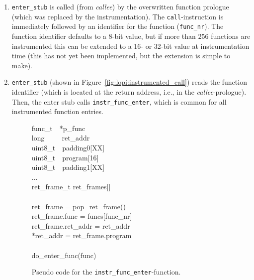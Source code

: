 \begin{enumerate}
\item \texttt{enter\_stub} is called (from \emph{callee}) by the overwritten
  function prologue (which was replaced by the instrumentation). The
  \texttt{call}-instruction is immediately followed by an identifier for the
  function (\texttt{func\_nr}). The function identifier defaults to a 8-bit
  value, but if more than 256 functions are instrumented this can be extended
  to a 16- or 32-bit value at instrumentation time (this has not yet been
  implemented, but the extension is simple to make).

\item \texttt{enter\_stub} (shown in Figure~\ref{fig:lopi:instrumented_call}) reads
  the function identifier (which is located at the return address, i.e., in the
  \emph{callee}-prologue). Then, the enter stub calls
  \texttt{instr\_func\_enter}, which is common for all instrumented function
  entries.

\begin{figure}[htb]
  \begin{center}
    \begin{pseudocode}
          func\_t~~*p\_func \\
          long~~~~~ret\_addr \\
          uint8\_t~~padding0[XX] \\
          uint8\_t~~program[16]\\
          uint8\_t~~padding1[XX] \\
          ...
        \ENDSTRUCT
        \\
        ret\_frame\_t ret\_frames[]
        \\
        \\
          ret\_frame = pop\_ret\_frame()\\
          ret\_frame.func = funcs[func\_nr]\\
          ret\_frame.ret\_addr = ret\_addr\\
          *ret\_addr = ret\_frame.program\\
          \\
          do\_enter\_func(func)
        \ENDFUNC
      \end{pseudocode}
    \end{center}
    \caption{Pseudo code for the \texttt{instr\_func\_enter}-function.}
    \label{fig:lopi:instr_func_entry_code}
\end{figure}


\end{enumerate}
